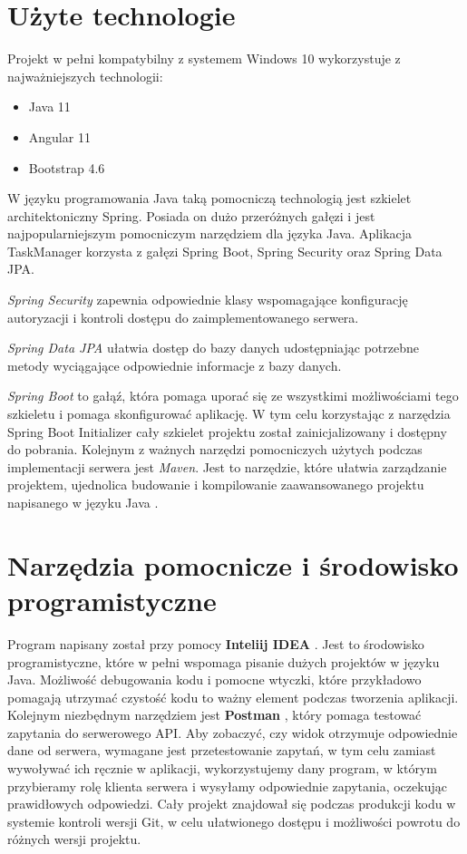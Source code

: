 \section{Użyte technologie}
Projekt w pełni kompatybilny z systemem Windows 10 wykorzystuje z najważniejszych technologii:
\begin{itemize}
	\item Java 11
	\item Angular 11
	\item Bootstrap 4.6
	
\end{itemize}
W języku programowania Java taką pomocniczą technologią jest szkielet architektoniczny Spring. Posiada on dużo przeróżnych gałęzi i jest najpopularniejszym pomocniczym narzędziem dla języka Java. Aplikacja TaskManager korzysta z gałęzi Spring Boot, Spring Security oraz Spring Data JPA. 

\textit{Spring Security} zapewnia odpowiednie klasy wspomagające konfigurację autoryzacji i kontroli dostępu do zaimplementowanego serwera. \cite{SpringSecurity}   

\textit{Spring Data JPA} ułatwia dostęp do bazy danych udostępniając potrzebne metody wyciągające odpowiednie informacje z bazy danych.\cite{SpringData}  

\textit{Spring Boot} to gałąź, która pomaga uporać się ze wszystkimi możliwościami tego szkieletu i pomaga skonfigurować aplikację. 
W tym celu korzystając z narzędzia Spring Boot Initializer \cite{SpringInitializr} cały szkielet projektu został zainicjalizowany i dostępny do pobrania.
Kolejnym z ważnych narzędzi pomocniczych użytych podczas implementacji serwera jest \textit{ Maven}. Jest to narzędzie, które ułatwia zarządzanie projektem, ujednolica budowanie i kompilowanie zaawansowanego projektu napisanego w języku Java \cite{ApacheMavenProject}. 

\section{Narzędzia pomocnicze i środowisko programistyczne }
Program napisany został przy pomocy \textbf{Inteliij IDEA} . Jest to środowisko programistyczne, które w pełni wspomaga pisanie dużych projektów w języku Java. Możliwość debugowania kodu i pomocne wtyczki, które przykładowo pomagają utrzymać czystość kodu to ważny element podczas tworzenia aplikacji.
Kolejnym niezbędnym narzędziem jest \textbf{Postman }, który pomaga testować zapytania do serwerowego API. Aby zobaczyć, czy widok otrzymuje odpowiednie dane od serwera, wymagane jest przetestowanie zapytań, w tym celu zamiast wywoływać ich ręcznie w aplikacji, wykorzystujemy dany program, w którym przybieramy rolę klienta serwera i wysyłamy odpowiednie zapytania, oczekując prawidłowych odpowiedzi. \cite{Postman}
Cały projekt znajdował się podczas produkcji kodu w systemie kontroli wersji Git, w celu ułatwionego dostępu i możliwości powrotu do różnych wersji projektu.\cite{git}


